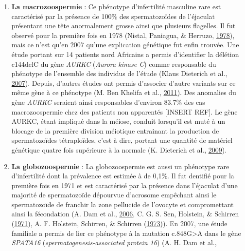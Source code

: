 \documentclass[12pt,twoside]{reedthesis}
\providecommand{\tightlist}{%
  \setlength{\itemsep}{0pt}\setlength{\parskip}{0pt}}
\theoremstyle{definition}
\theoremstyle{definition}
\theoremstyle{remark}
\begin{document}
\begin{enumerate}
    \begin{enumerate}
    \def\labelenumii{\alph{enumii}.}
    \tightlist
    \item
      \textbf{La macrozoospermie} : Ce phénotype d'infertilité masculine
      rare est caractérisé par la présence de 100\% des spermatozoïdes de
      l'éjaculat présentant une tête anormalement grosse ainsi que
      plusieurs flagelles. Il fut observé pour la première fois en 1978
      (Nistal, Paniagua, \& Herruzo,
      \protect\hyperlink{ref-Nistal}{1978}), mais ce n'est qu'en 2007
      qu'une explication génétique fut enfin trouvée. Une étude portant
      sur 14 patients nord Africains a permis d'identifier la délétion
      c144delC du gène \emph{AURKC} (\emph{Aurora kinase C}) comme
      responsable du phénotype de l'ensemble des individus de l'étude
      (Klaus Dieterich et al.,
      \protect\hyperlink{ref-Dieterich2007}{2007}). Depuis, d'autres
      études ont permis d'associer d'autre variants sur ce même gène à ce
      phénotype (M. Ben Khelifa et al.,
      \protect\hyperlink{ref-BenKhelifa2011}{2011}). Des anomalies du gène
      \emph{AURKC} seraient ainsi responsables d'environ 83.7\% des cas
      macrozoospermie chez des patients non apparentés {[}INSERT REF{]}.
      Le gène AURKC, étant impliqué dans la méiose, conduit lorsqu'il est
      muté à un blocage de la première division méiotique entrainant la
      production de spermatozoïdes tétraploïdes, c'est à dire, portant une
      quantité de matériel génétique quatre fois supérieure à la normale
      (K. Dieterich et al.,
      \protect\hyperlink{ref-Dieterich2009}{2009}).\\
    \item
      \textbf{La globozoospermie} : La globozoospermie est aussi un
      phénotype rare d'infertilité dont la prévalence est estimée à de
      0,1\%. Il fut dentifié pour la première fois en 1971 et est
      caractérisé par la présence dans l'éjaculat d'une majorité de
      spermatozoïde dépourvue d'acrosome empêchant ainsi le spermatozoïde
      de franchir la zone pellucide de l'ovocyte et compromettant ainsi la
      fécondation (A. Dam et al., \protect\hyperlink{ref-Dam2006}{2006},
      C. G. S. Sen, Holstein, \& Schirren
      (\protect\hyperlink{ref-Sen2009}{1971}), A. F. Holstein, Schirren,
      \& Schirren (\protect\hyperlink{ref-Holstein1973}{1973})). En 2007,
      une étude familiale a permis de lier ce phénotype à la mutation
      c.848G\textgreater{}A dans le gène \emph{SPATA16}
      (\emph{spermatogenesis-associated protein 16}) (A. H. Dam et al.,

\end{enumerate}
\end{enumerate}
\end{document}
